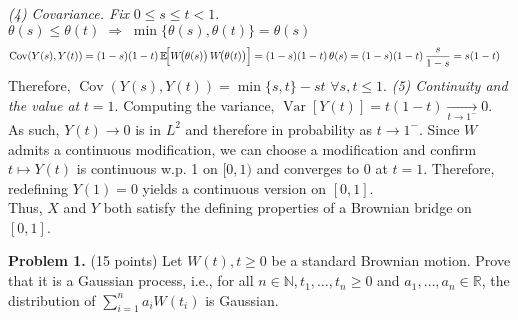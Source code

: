 \documentclass{article}
\begin{document}
{\textit{(4) Covariance. Fix }$0\le s\le t<1.$
$\theta(s)\le\theta(t)\;\Longrightarrow\;
\min\{\theta(s),\theta(t)\}=\theta(s)$
\[
\begin{aligned}
\operatorname{Cov}(Y(s),Y(t))
&=(1-s)(1-t)\,
      \mathbb E\!\Bigl[W\!\bigl(\theta(s)\bigr)\,W\!\bigl(\theta(t)\bigr)\Bigr]=(1-s)(1-t)\,\theta(s)=(1-s)(1-t)\,\frac{s}{1-s}=s(1-t)
\end{aligned}
\]
Therefore, $\operatorname{Cov}(Y(s),Y(t))=\min\{s,t\}-st$ $\forall s,t\le1$.
\textit{(5)  Continuity and the value at }$t=1.$
Computing the variance, $\operatorname{Var}[Y(t)]=t(1-t)\xrightarrow[t\to1^-]{}0$.  
As such, $Y(t)\to0$ is in $L^2$ and therefore in probability as $t\to1^-$.  
Since $W$ admits a continuous modification, we can choose a modification and confirm $t\mapsto Y(t)$ is continuous w.p. 1 on $[0,1)$ and converges to $0$ at $t=1$. 
Therefore, redefining $Y(1)=0$ yields a continuous version on $[0,1]$. \\
Thus, $X$ and $Y$ both satisfy the defining properties of a Brownian bridge on $[0,1]$.
}




\textbf{Problem 1.} (15 points) 
Let $W(t), t \geq 0$ be a standard
Brownian motion. Prove that it is a Gaussian process, i.e., for all
$n \in \mathbb{N}, t_1, \dots, t_n \geq 0$ and $a_1, \dots, a_n \in
\mathbb{R}$, the distribution of $\sum_{i=1}^{n} a_i W(t_i)$ is
Gaussian.
\end{document}
